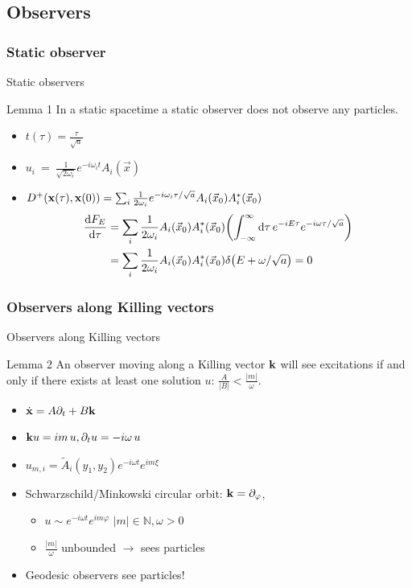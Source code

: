 \documentclass{beamer}
\renewcommand{\va}[1]{\vec{#1}}
\begin{document}
\subsection{Observers}
\subsubsection{Static observer}
\begin{frame}{Static observers}
\begin{block}{Lemma 1}
In a static spacetime a static observer does not observe any particles.
\end{block}
\begin{itemize}
	\item \(t(\tau) = \frac{\tau}{\sqrt{a}}\)
	\item \(u_i~=~\frac{1}{\sqrt{2\omega_i}}e^{-i\omega_i t} A_i(\va{x})\)
	\item \(D^+(\vb{x}(\tau), \vb{x}(0)) = \sum_i \frac{1}{2\omega_i} e^{-i\omega_i\tau/\sqrt{a}} A_i(\va{x}_0)A_i^*(\va{x}_0)\)
	\begin{align*}
	\dv{F_E}{\tau} &= \sum_i \frac{1}{2\omega_i} A_i(\va{x}_0)A_i^*(\va{x}_0) \qty(\int_{-\infty}^\infty \dd{\tau} e^{-i E \tau} e^{-i\omega  \tau/\sqrt{a}})\\
	 	&= \sum_i \frac{1}{2\omega_i} A_i(\va{x}_0)A_i^*(\va{x}_0) \delta\qty(E + \omega/\sqrt{a}) = 0
	\end{align*}
\end{itemize}
\end{frame}

\subsubsection{Observers along Killing vectors}
\begin{frame}{Observers along Killing vectors}
\begin{block}{Lemma 2}
An observer moving along a Killing vector \(\vb{k}\) will see excitations if and only if there exists at least one solution \(u\): \(\frac{A}{|B|} < \frac{|m|}{\omega}\).
\begin{itemize}
	\item \(\dot{\vb{x}} = A\partial_t + B\vb{k}\)
	\item \(\vb{k} u = i m\,u, \partial_t u = - i \omega\,u\)
\end{itemize}
\end{block} 
\begin{itemize}
	\item \(u_{m, i} = \tilde{A}_i(y_1, y_2) e^{-i\omega t} e^{i m \xi}\)
	\item Schwarzschild/Minkowski circular orbit: \(\vb{k} = \partial_\varphi\), 
	\begin{itemize}
		\item \(u \sim e^{-i\omega t}e^{i m \varphi}\)\hspace{5cm} \(|m| \in \mathbb{N}, \omega > 0\)
		\item \(\frac{|m|}{\omega}\) unbounded \(\to\) sees particles
	\end{itemize}
	\item Geodesic observers see particles!
\end{itemize}
\end{frame}
\end{document}
